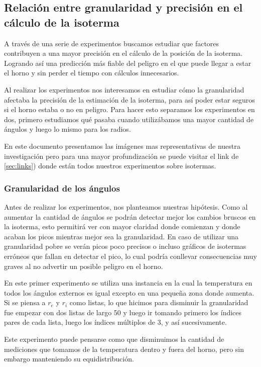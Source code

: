 \subsection{Relación entre granularidad y precisión en el cálculo de la isoterma}
A través de una serie de experimentos buscamos estudiar que factores contribuyen a una mayor precisión en el cálculo de la posición de la isoterma. Logrando así una predicción más fiable del peligro en el que puede llegar a estar el horno y sin perder el tiempo con cálculos innecesarios.

Al realizar los experimentos nos interesamos en estudiar cómo la granularidad afectaba la precisión de la estimación de la isoterma, para así poder estar seguros si el horno estaba o no en peligro. Para hacer esto separamos los experimentos en dos, primero estudiamos qué pasaba cuando utilizábamos una mayor cantidad de ángulos y luego lo mismo para los radios.

En este documento presentamos las imágenes mas representativas de nuestra investigación pero para una mayor profundización se puede visitar el link de \ref{sec:links}) donde están todos nuestros experimentos sobre isotermas.


\subsubsection{Granularidad de los ángulos}

Antes de realizar los experimentos, nos planteamos nuestras hipótesis. Como al aumentar la cantidad de ángulos se podrán detectar mejor los cambios bruscos en la isoterma, esto permitirá ver con mayor claridad donde comienzan y donde acaban los picos mientras mejor sea la granularidad. En caso de utilizar una granularidad pobre se verán picos poco precisos o incluso gráficos de isotermas erróneos que fallan en detectar el pico, lo cual podría conllevar consecuencias muy graves al no advertir un posible peligro en el horno.

En este primer experimento se utiliza una instancia en la cual la temperatura en todos los ángulos externos es igual excepto en una pequeña zona donde aumenta. 
Si se piensa a $r_e$ y $r_i$ como listas, lo que hicimos para disminuir la granularidad fue empezar con dos listas de largo 50 y luego ir tomando primero los índices pares de cada lista, luego los índices múltiplos de 3, y así sucesivamente.

Este experimento puede pensarse como que disminuimos la cantidad de mediciones que tomamos de la temperatura dentro y fuera del horno, pero sin embargo manteniendo su equidistribución.


